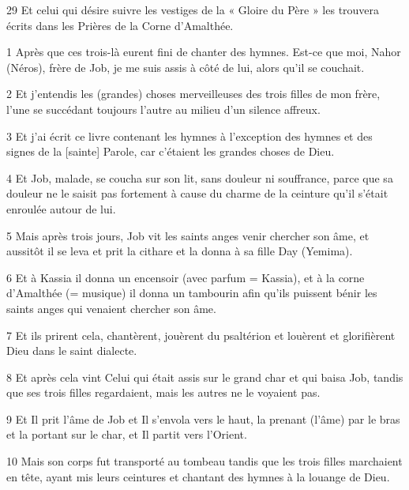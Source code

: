 \par 29 Et celui qui désire suivre les vestiges de la « Gloire du Père » les trouvera écrits dans les Prières de la Corne d'Amalthée.


\par 1 Après que ces trois-là eurent fini de chanter des hymnes. Est-ce que moi, Nahor (Néros), frère de Job, je me suis assis à côté de lui, alors qu'il se couchait.

\par 2 Et j'entendis les (grandes) choses merveilleuses des trois filles de mon frère, l'une se succédant toujours l'autre au milieu d'un silence affreux.

\par 3 Et j'ai écrit ce livre contenant les hymnes à l'exception des hymnes et des signes de la [sainte] Parole, car c'étaient les grandes choses de Dieu.

\par 4 Et Job, malade, se coucha sur son lit, sans douleur ni souffrance, parce que sa douleur ne le saisit pas fortement à cause du charme de la ceinture qu'il s'était enroulée autour de lui.

\par 5 Mais après trois jours, Job vit les saints anges venir chercher son âme, et aussitôt il se leva et prit la cithare et la donna à sa fille Day (Yemima).

\par 6 Et à Kassia il donna un encensoir (avec parfum = Kassia), et à la corne d'Amalthée (= musique) il donna un tambourin afin qu'ils puissent bénir les saints anges qui venaient chercher son âme.

\par 7 Et ils prirent cela, chantèrent, jouèrent du psaltérion et louèrent et glorifièrent Dieu dans le saint dialecte.

\par 8 Et après cela vint Celui qui était assis sur le grand char et qui baisa Job, tandis que ses trois filles regardaient, mais les autres ne le voyaient pas.

\par 9 Et Il prit l'âme de Job et Il s'envola vers le haut, la prenant (l'âme) par le bras et la portant sur le char, et Il partit vers l'Orient.

\par 10 Mais son corps fut transporté au tombeau tandis que les trois filles marchaient en tête, ayant mis leurs ceintures et chantant des hymnes à la louange de Dieu.


